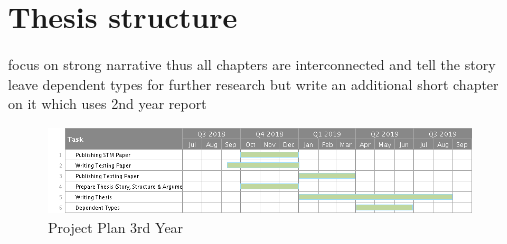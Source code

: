 \section{Thesis structure}
focus on strong narrative thus all chapters are interconnected and tell the story
leave dependent types for further research but write an additional short chapter on it which uses 2nd year report

\clearpage

%	

\begin{landscape}
\begin{figure}
	\centering
	\includegraphics[width=1.5\textwidth, angle=0]{./fig/projectplan_3rd_year.png}
	\caption{Project Plan 3rd Year}
\end{figure}
\end{landscape}